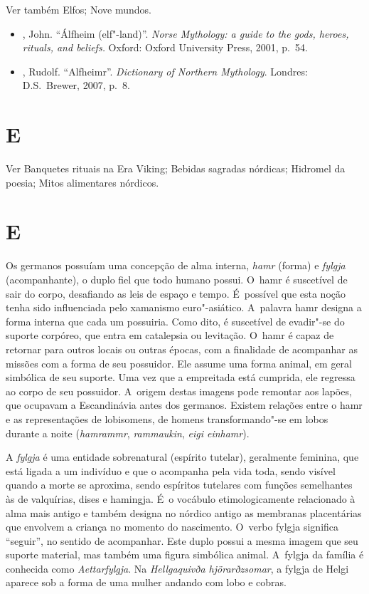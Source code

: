 Ver também Elfos; Nove mundos.



\begin{itemize}\footnotesize
\item
  , John. ``Álfheim (elf"-land)''. \emph{Norse Mythology: a guide to
  the gods, heroes, rituals, and beliefs.} Oxford: Oxford University
  Press, 2001, p.~54.
\item
  , Rudolf. ``Alfheimr''. \emph{Dictionary of Northern Mythology}.
  Londres: D.S.~Brewer, 2007, p.~8.
\end{itemize}

\section{ E }

Ver Banquetes rituais na Era Viking; Bebidas sagradas nórdicas;
Hidromel da poesia; Mitos alimentares nórdicos.

\section{ E }

Os germanos possuíam uma concepção de alma interna, \emph{hamr} (forma)
e \emph{fylgja} (acompanhante), o duplo fiel que todo humano possui. O~hamr 
é suscetível de sair do corpo, desafiando as leis de espaço e
tempo. É~possível que esta noção tenha sido influenciada pelo xamanismo
euro"-asiático. A~palavra hamr designa a forma interna que cada um
possuiria. Como dito, é suscetível de evadir"-se do suporte corpóreo, que
entra em catalepsia ou levitação. O~hamr é capaz de retornar para outros
locais ou outras épocas, com a finalidade de acompanhar as missões com a
forma de seu possuidor. Ele assume uma forma animal, em geral simbólica
de seu suporte. Uma vez que a empreitada está cumprida, ele regressa ao
corpo de seu possuidor. A~origem destas imagens pode remontar aos
lapões, que ocupavam a Escandinávia antes dos germanos. Existem relações
entre o hamr e as representações de lobisomens, de homens
transformando"-se em lobos durante a noite (\emph{hamrammr},
\emph{rammaukin}, \emph{eigi einhamr}).

A \emph{fylgja} é uma entidade sobrenatural (espírito tutelar),
geralmente feminina, que está ligada a um indivíduo e que o acompanha
pela vida toda, sendo visível quando a morte se aproxima, sendo
espíritos tutelares com funções semelhantes às de valquírias, dises e
hamingja. É~o vocábulo etimologicamente relacionado à alma mais antigo e
também designa no nórdico antigo as membranas placentárias que envolvem
a criança no momento do nascimento. O~verbo fylgja significa ``seguir'',
no sentido de acompanhar. Este duplo possui a mesma imagem que seu
suporte material, mas também uma figura simbólica animal. A~fylgja da
família é conhecida como \emph{Aettarfylgja}. Na \emph{Hellgaquivða
hjörarðzsomar}, a fylgja de Helgi aparece sob a forma de uma mulher
andando com lobo e cobras.

